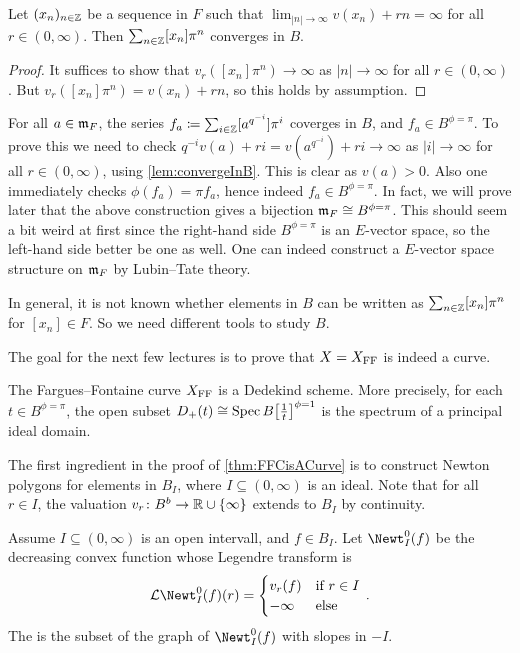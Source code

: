 \documentclass[a4paper, 10pt, oneside, DIV=9, chapterprefix=true, numbers=enddot,bibliography=totoc]{scrbook}
\begin{document}
\begin{lem}\label{lem:convergeInB}
	Let $(x_n)_{n\in\mathbb{Z}}$ be a sequence in $F$ such that $\lim_{|n|\to\infty}v(x_n)+rn=\infty$ for all $r\in(0,\infty)$. Then $\sum_{n\in\mathbb{Z}}[x_n]\pi^n$ converges in $B$.
\end{lem}
\begin{proof}
	It suffices to show that $v_r([x_n]\pi^n)\to\infty$ as $|n|\to\infty$ for all $r\in(0,\infty)$. But $v_r([x_n]\pi^n)=v(x_n)+rn$, so this holds by assumption.
\end{proof}
\begin{rem}\label{lem:convergenceInB}
	\begin{numerate}
		\item For all $a\in \mathfrak{m}_F$, the series $f_a\coloneqq \sum_{i\in\mathbb{Z}}[a^{q^{-i}}]\pi^i$ coverges in $B$, and $f_a\in B^{\phi=\pi}$. To prove this we need to check $q^{-i}v(a)+ri=v(a^{q^{-i}})+ri\to \infty$ as $|i|\to\infty$ for all $r\in(0,\infty)$, using \cref{lem:convergeInB}. This is clear as $v(a)>0$. Also one immediately checks $\phi(f_a)=\pi f_a$, hence indeed $f_a\in B^{\phi=\pi}$. In fact, we will prove later that the above construction gives a bijection $\mm_F\cong B^{\phi=\pi}$. This should seem a bit weird at first since the right-hand side $B^{\phi=\pi}$ is an $E$-vector space, so the left-hand side better be one as well. One can indeed construct a $E$-vector space structure on $\mathfrak{m}_F$ by Lubin--Tate theory.
		\item In general, it is not known whether elements in $B$ can be written as $\sum_{n\in\mathbb{Z}}[x_n]\pi^n$ for $[x_n]\in F$. So we need different tools to study $B$.
	\end{numerate}
\end{rem}
The goal for the next few lectures is to prove that $X=X_{\mathrm{FF}}$ is indeed a curve.
\begin{thm}\label{thm:FFCisACurve}
	The Fargues--Fontaine curve $X_{\mathrm{FF}}$ is a Dedekind scheme. More precisely, for each $t\in B^{\phi=\pi}$, the open subset $D_+(t)\cong \Spec B\big[\frac 1t\big]^{\phi=1}$ is the spectrum of a principal ideal domain.
\end{thm}
The first ingredient in the proof of \cref{thm:FFCisACurve} is to construct Newton polygons for elements in $B_I$, where $I\subseteq (0,\infty)$ is an ideal. Note that for all $r\in I$, the valuation $v_r\colon B^b\morphism \IR\cup\{\infty\}$ extends to $B_I$ by continuity.
\begin{defi}\label{def:NewtOpen}
	Assume $I\subseteq (0,\infty)$ is an open intervall, and $f\in B_I$. Let $\Newt_I^0(f)$ be the decreasing convex function whose Legendre transform is
	\begin{equation*}
		\Ll\Newt_I^0(f)(r)=\begin{cases}
		v_r(f) & \text{if }r\in I\\
		-\infty & \text{else}
		\end{cases}\,.
	\end{equation*}
	The  is the subset of the graph of $\Newt_I^0(f)$ with slopes in $-I$.
\end{defi}
\end{document}
